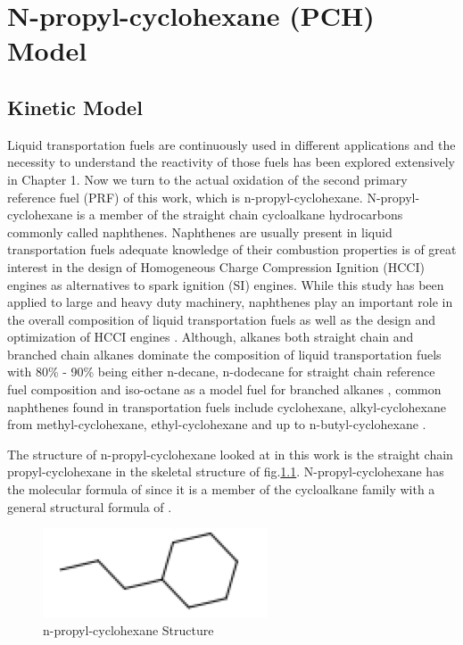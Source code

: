 \chapter{N-propyl-cyclohexane (PCH) Model}
\section{Kinetic Model}

Liquid transportation fuels are continuously used in different applications and the necessity to understand the reactivity of those fuels has been explored extensively in Chapter 1. Now we turn to the actual oxidation of the second primary reference fuel (PRF) of this work, which is n-propyl-cyclohexane. N-propyl-cyclohexane is a member of the straight chain cycloalkane hydrocarbons commonly called naphthenes. Naphthenes are usually present in liquid transportation fuels adequate knowledge of their combustion properties is of great interest in the design of Homogeneous Charge Compression Ignition (HCCI) engines as alternatives to spark ignition (SI) engines. While this study has been applied to large and heavy duty machinery, naphthenes play an important role in the overall composition of liquid transportation fuels as well as the design and optimization of HCCI engines \cite{Aceves1999CompressionCombustion}. Although, alkanes both straight chain and branched chain alkanes dominate the composition of liquid transportation fuels with 80\% - 90\% being either n-decane, n-dodecane for straight chain reference fuel composition and iso-octane as a model fuel for branched alkanes , common naphthenes found in transportation fuels include cyclohexane, alkyl-cyclohexane from methyl-cyclohexane, ethyl-cyclohexane and up to n-butyl-cyclohexane \cite{Granata2003ANaphthenes}. 

The structure of n-propyl-cyclohexane looked at in this work is the straight chain propyl-cyclohexane in the skeletal structure of fig.\ref{fig:n-pch}. N-propyl-cyclohexane has the molecular formula of  since it is a member of the cycloalkane family with a general structural formula of . 

\begin{figure}[!htp]
    \centering
    \includegraphics[scale=0.5, keepaspectratio]{images/pch-skeletal-formula.png}
    \caption{n-propyl-cyclohexane Structure}
    \label{fig:n-pch}
\end{figure}





